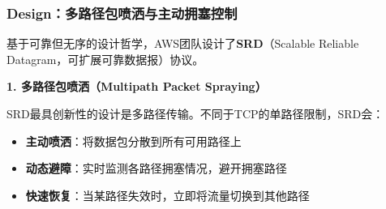 \subsubsection{Design：多路径包喷洒与主动拥塞控制}

基于可靠但无序的设计哲学，AWS团队设计了\textbf{SRD}（Scalable Reliable Datagram，可扩展可靠数据报）协议。

\textbf{1. 多路径包喷洒（Multipath Packet Spraying）}

SRD最具创新性的设计是多路径传输。不同于TCP的单路径限制，SRD会：

\begin{itemize}
    \item \textbf{主动喷洒}：将数据包分散到所有可用路径上
    \item \textbf{动态避障}：实时监测各路径拥塞情况，避开拥塞路径
    \item \textbf{快速恢复}：当某路径失效时，立即将流量切换到其他路径
\end{itemize}

